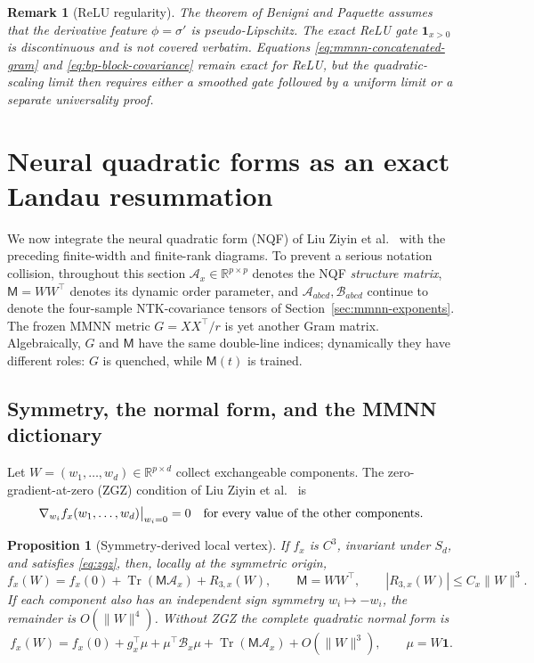 \documentclass{article}
\newtheorem{proposition}[theorem]{Proposition}
\newtheorem{remark}[theorem]{Remark}
\newcommand{\R}{\mathbb R}
\newcommand{\Tr}{\operatorname{Tr}}
\newcommand{\one}{\mathbf 1}
\begin{document}
\begin{remark}[ReLU regularity]
\label{rem:bp-relu}
The theorem of Benigni and Paquette \citep{BenigniPaquette2025} assumes that
the derivative feature \(\phi=\sigma'\) is pseudo-Lipschitz.  The exact ReLU gate
\(\one_{x>0}\) is discontinuous and is not covered verbatim.  Equations
\eqref{eq:mmnn-concatenated-gram} and \eqref{eq:bp-block-covariance} remain
exact for ReLU, but the quadratic-scaling limit then requires either a
smoothed gate followed by a uniform limit or a separate universality proof.
\end{remark}

\section{Neural quadratic forms as an exact Landau resummation}
\label{sec:nqf}

We now integrate the neural quadratic form (NQF) of
Liu Ziyin et al.~\citep{NQF2026} with the preceding finite-width and
finite-rank diagrams.
To prevent a serious notation collision, throughout this section
\(\mathscr A_x\in\R^{p\times p}\) denotes the NQF \emph{structure matrix},
\(\mathsf M=WW^\top\) denotes its dynamic order parameter, and
\(\mathcal A_{abcd},\mathcal B_{abcd}\) continue to denote the four-sample
NTK-covariance tensors of Section~\ref{sec:mmnn-exponents}.  The frozen MMNN
metric \(G=XX^\top/r\) is yet another Gram matrix.  Algebraically, \(G\) and
\(\mathsf M\) have the same double-line indices; dynamically they have
different roles: \(G\) is quenched, while \(\mathsf M(t)\) is trained.

\subsection{Symmetry, the normal form, and the MMNN dictionary}

Let \(W=(w_1,\ldots,w_d)\in\R^{p\times d}\) collect exchangeable components.
The zero-gradient-at-zero (ZGZ) condition of Liu Ziyin et
al.~\citep{NQF2026} is
\begin{equation}
\nabla_{w_i}f_x(w_1,\ldots,w_d)\big|_{w_i=0}=0
\quad\hbox{for every value of the other components.}
\label{eq:zgz}
\end{equation}

\begin{proposition}[Symmetry-derived local vertex]
\label{prop:nqf-normal-form}
If \(f_x\) is \(C^3\), invariant under \(S_d\), and satisfies
\eqref{eq:zgz}, then, locally at the symmetric origin,
\begin{equation}
f_x(W)=f_x(0)+\Tr(\mathsf M\mathscr A_x)+R_{3,x}(W),
\qquad \mathsf M=WW^\top,
\qquad |R_{3,x}(W)|\le C_x\|W\|^3.
\label{eq:nqf-local-form}
\end{equation}
If each component also has an independent sign symmetry
\(w_i\mapsto-w_i\), the remainder is \(O(\|W\|^4)\).  Without ZGZ the
complete quadratic normal form is
\begin{equation}
f_x(W)=f_x(0)+g_x^\top\mu+\mu^\top\mathscr B_x\mu
+\Tr(\mathsf M\mathscr A_x)+O(\|W\|^3),
\qquad \mu=W\one.
\label{eq:nqf-general-form}
\end{equation}
\end{proposition}
\end{document}
